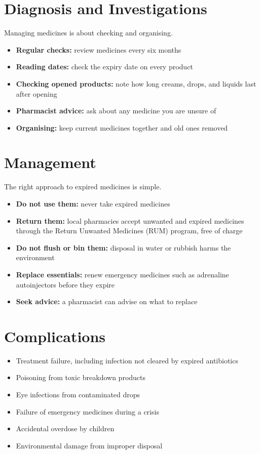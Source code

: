 \section*{Diagnosis and Investigations}
Managing medicines is about checking and organising.
\begin{itemize}
    \item \textbf{Regular checks:} review medicines every six months
    \item \textbf{Reading dates:} check the expiry date on every product
    \item \textbf{Checking opened products:} note how long creams, drops, and liquids last after opening
    \item \textbf{Pharmacist advice:} ask about any medicine you are unsure of
    \item \textbf{Organising:} keep current medicines together and old ones removed
\end{itemize}

\section*{Management}
The right approach to expired medicines is simple.
\begin{itemize}
    \item \textbf{Do not use them:} never take expired medicines
    \item \textbf{Return them:} local pharmacies accept unwanted and expired medicines through the Return Unwanted Medicines (RUM) program, free of charge
    \item \textbf{Do not flush or bin them:} disposal in water or rubbish harms the environment
    \item \textbf{Replace essentials:} renew emergency medicines such as adrenaline autoinjectors before they expire
    \item \textbf{Seek advice:} a pharmacist can advise on what to replace
\end{itemize}

\section*{Complications}
\begin{itemize}
    \item Treatment failure, including infection not cleared by expired antibiotics
    \item Poisoning from toxic breakdown products
    \item Eye infections from contaminated drops
    \item Failure of emergency medicines during a crisis
    \item Accidental overdose by children
    \item Environmental damage from improper disposal
\end{itemize}

